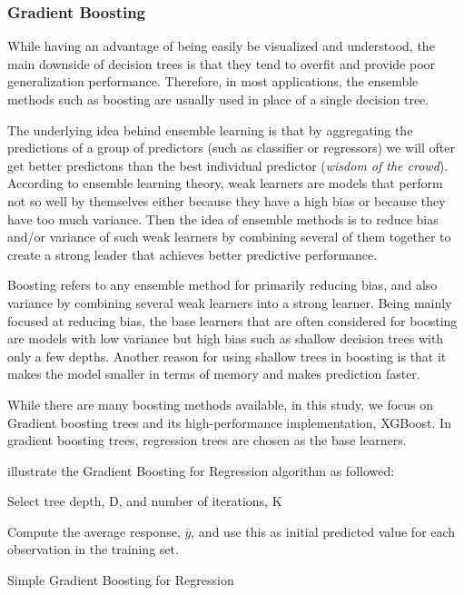 \subsubsection*{Gradient Boosting}

While having an advantage of being easily be visualized and understood, the main
downside of decision trees is that they tend to overfit and provide poor
generalization performance. Therefore, in most applications, the ensemble
methods such as boosting are usually used in place of a single decision tree.

The underlying idea behind ensemble learning is that by aggregating the
predictions of a group of predictors (such as classifier or regressors) we will
ofter get better predictons than the best individual predictor (\textit{wisdom of the
crowd}).
According to ensemble learning theory, weak learners are models that perform not
so well by themselves either because they have a high bias or because they have
too much variance. Then the idea of ensemble methods is to reduce bias and/or
variance of such weak learners by combining several of them together to create a
strong leader that achieves better predictive performance.

Boosting refers to any ensemble method for primarily reducing bias, and also
variance by combining several weak learners into  a strong learner.  Being
mainly focused at reducing bias, the base learners that are often considered for
boosting are models with low variance but high bias such as shallow decision
trees with only a few depths.
Another reason for using shallow trees in boosting is that it makes the model
smaller in terms of memory and makes prediction faster.

While there are many boosting methods available, in this study, we focus on
Gradient boosting trees and its high-performance implementation, XGBoost. In
gradient boosting trees,  regression trees are chosen  as the base learners.

\textcite{kuhn2013applied} illustrate the Gradient Boosting for
Regression algorithm as followed:

\begin{algorithm}[H]
\SetAlgoLined

\renewcommand{\labelenumi}{(\Roman{enumi})}
Select tree depth, D, and number of iterations, K

Compute the average response, $\bar{y}$, and use this as initial predicted value
for each observation in the training set.

 \caption{Simple Gradient Boosting for Regression}
\end{algorithm}

